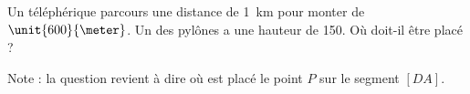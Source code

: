 
\begin{exercice}\label{exo2smath-0152}

    Un téléphérique parcours une distance de \SI{1}{\kilo\meter} pour monter de \( \unit{600}{\meter}\). Un des pylônes a une hauteur de \unit{150}{\meter}. Où doit-il être placé ?

\begin{center}
   
\end{center}


    Note : la question revient à dire où est placé le point \( P\) sur le segment \( [DA]\).

\end{exercice}
